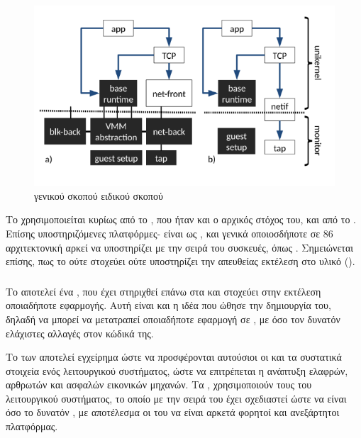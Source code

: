 \begin{figure}[h]
  \includegraphics[width=\textwidth]{pictures/unikern-unikernel+monitor(solo5).PNG}
  \caption{ γενικού σκοπού  ειδικού σκοπού}
  \label{fig:solo5}
\end{figure}


Το  χρησιμοποιείται κυρίως από το , που ήταν και ο
αρχικός στόχος του, και από το . Επίσης υποστηριζόμενες
πλατφόρμες- είναι  ως ,
και γενικά οποιοσδήποτε  σε 86 αρχιτεκτονική αρκεί
να υποστηρίζει με την σειρά του  συσκευές, όπως \cite{Orestis}.
Σημειώνεται επίσης, πως το  ούτε στοχεύει ούτε υποστηρίζει την
απευθείας εκτέλεση στο υλικό ().

\subsubsection{}

Το  αποτελεί ένα , που έχει στηριχθεί
επάνω στα  και στοχεύει στην εκτέλεση οποιαδήποτε
 εφαρμογής. Αυτή είναι και η ιδέα που ώθησε
την δημιουργία του, δηλαδή να μπορεί να μετατραπεί οποιαδήποτε
 εφαρμογή σε , με όσο τον δυνατόν ελάχιστες αλλαγές
στον κώδικά της\cite{Orestis}\cite{RumprunXen}.
\newline

Το  των  αποτελεί εγχείρημα ώστε να προσφέρονται
αυτούσιοι οι  και τα συστατικά στοιχεία ενός λειτουργικού
συστήματος, ώστε να επιτρέπεται η ανάπτυξη ελαφρών, αρθρωτών και
ασφαλών εικονικών μηχανών. Τα , χρησιμοποιούν τους
 του  λειτουργικού συστήματος, το οποίο με την σειρά του
έχει σχεδιαστεί ώστε να είναι όσο το δυνατόν , με αποτέλεσμα
οι  του να είναι αρκετά φορητοί και ανεξάρτητοι πλατφόρμας\cite{noOSnoProb}.
\newline

